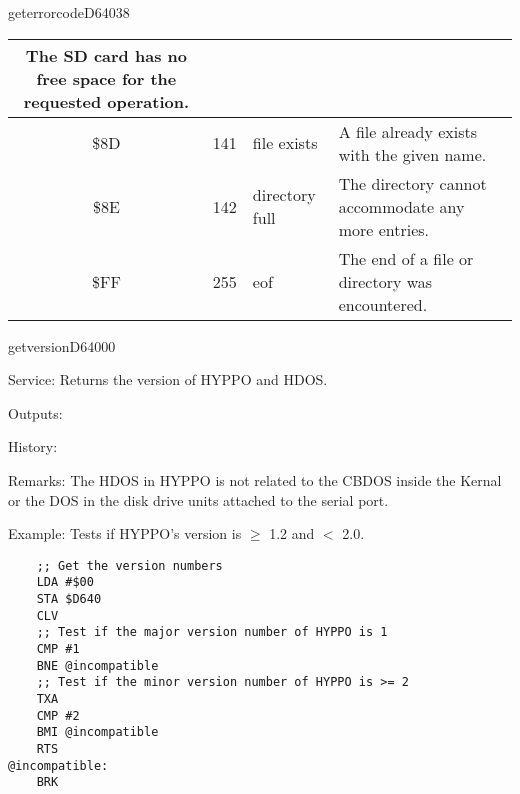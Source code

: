 \begin{hyppotrap}{geterrorcode}{D640}{38}
{\begin{longtable}{|c|r|l|p{8cm}|}
    The SD card has no free space for the requested operation.
    \\\hline
    \index{HYPPO Error Codes!\$8D}
    \$8D & 141 & file exists &
    A file already exists with the given name.
    \\\hline
    \index{HYPPO Error Codes!\$8E}
    \$8E & 142 & directory full &
    The directory cannot accommodate any more entries.
    \\\hline
    \index{HYPPO Error Codes!\$FF}
    \$FF & 255 & eof &
    The end of a file or directory was encountered.
    \\\hline
  \end{longtable}
}
\end{hyppotrap}


\newpage
\begin{hyppotrap}{getversion}{D640}{00}
\item [Service:]
  Returns the version of HYPPO and HDOS.
\item [Outputs:]
\item [History:]
\item [Remarks:]
  The HDOS in HYPPO is not related to the CBDOS inside the Kernal or the
  DOS in the disk drive units attached to the serial port.
\item [Example:]
  Tests if HYPPO's version is $\geq$ 1.2 and $<$ 2.0.
\begin{tcolorbox}[colback=black,coltext=white]
\verbatimfont{\codefont}
\begin{verbatim}
    ;; Get the version numbers
    LDA #$00
    STA $D640
    CLV
    ;; Test if the major version number of HYPPO is 1
    CMP #1
    BNE @incompatible
    ;; Test if the minor version number of HYPPO is >= 2
    TXA
    CMP #2
    BMI @incompatible
    RTS
@incompatible:
    BRK
\end{verbatim}
\end{tcolorbox}
\end{hyppotrap}


